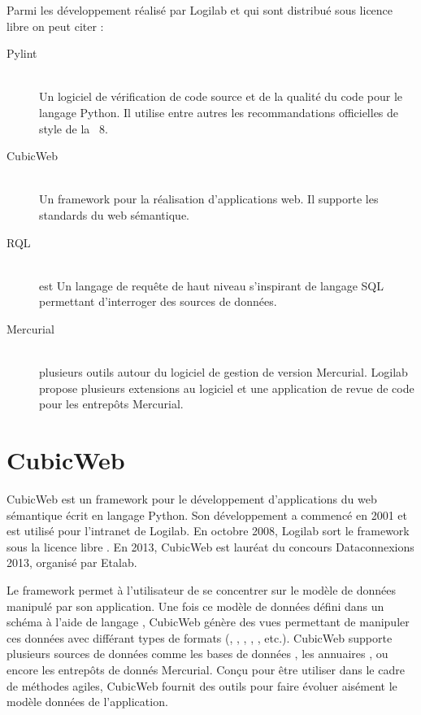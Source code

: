 Parmi les développement réalisé par Logilab et qui sont distribué sous licence
libre on peut citer : 
\begin{description} 
    \item[Pylint]\hfill\\ 
        Un logiciel de vérification de code source et de la qualité du code 
        pour le langage Python. Il utilise entre autres les recommandations officielles de 
        style de la  ~8.  
        \item[CubicWeb]\hfill\\ 
            Un framework pour la réalisation d’applications web. Il supporte 
            les standards du web sémantique.  
        \item[RQL]\hfill\\ 
             est Un langage de requête de haut niveau 
            s’inspirant de langage SQL permettant d'interroger des sources de 
            données.  
        \item[Mercurial] \hfill\\ 
            plusieurs outils autour du logiciel de gestion de version Mercurial. 
            Logilab propose plusieurs extensions au logiciel et une application 
            de revue de code pour les entrepôts Mercurial.  
\end{description}



\section{CubicWeb} 
CubicWeb est un framework pour le développement d'applications du web sémantique 
écrit en langage Python. Son développement a commencé en 2001 et est utilisé pour 
l'intranet de Logilab. En octobre 2008, Logilab sort le framework sous la licence 
libre . En 2013, CubicWeb est lauréat du concours 
Dataconnexions 2013, organisé par Etalab\cite{etalab}.

Le framework permet à l'utilisateur de se concentrer sur le modèle de données
manipulé par son application. Une fois ce modèle de données défini dans un schéma à
l'aide de langage , CubicWeb génère des vues permettant de
manipuler ces données avec différant types de formats (,
, , ,
, etc.). CubicWeb supporte plusieurs sources de données comme
les bases de données , les annuaires , ou encore les entrepôts
de donnés Mercurial. Conçu pour être utiliser dans le cadre de méthodes agiles, CubicWeb fournit des outils pour
faire évoluer aisément le modèle données de l'application.

